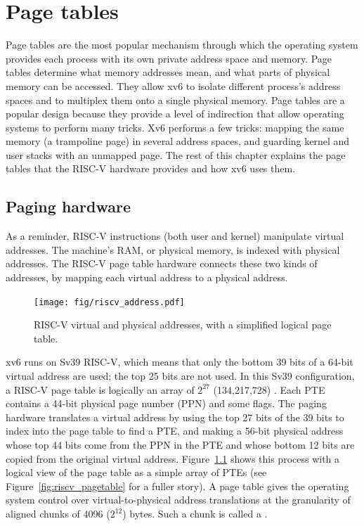 \chapter{Page tables}
\label{CH:MEM}

Page tables are the most popular mechanism through which the operating
system provides each process with its own private address space and
memory.  Page tables determine what memory addresses mean, and what
parts of physical memory can be accessed. They allow xv6 to isolate
different process's address spaces and to multiplex them onto a single
physical memory. Page tables are a popular design because they provide
a level of indirection that allow operating systems to perform many
tricks. Xv6 performs a few tricks: mapping the same memory
(a trampoline page) in several address spaces, and guarding kernel and
user stacks with an unmapped page. The rest of this chapter explains
the page tables that the RISC-V hardware provides and how xv6 uses
them.

\section{Paging hardware}
As a reminder,
RISC-V instructions (both user and kernel) manipulate virtual addresses.
The machine's RAM, or physical memory, is indexed with physical
addresses.
The RISC-V page table hardware connects these two kinds of addresses,
by mapping each virtual address to a physical address.

\begin{figure}[t]
\center
\texttt{[image: fig/riscv\_address.pdf]}
\caption{RISC-V virtual and physical addresses, with a simplified
logical page table.}
\label{fig:riscv_address}
\end{figure}

xv6 runs on Sv39 RISC-V, which means that only the bottom 39
bits of a 64-bit virtual address are used; the top 25 bits
are not used.
In this Sv39 configuration, a
RISC-V page table is logically an array of $2^{27}$ (134,217,728)
.  Each PTE contains a 44-bit
physical page number (PPN) and some flags. The paging hardware
translates a virtual address by using the top 27 bits of the 39 bits
to index into the page table to find a PTE, and making a 56-bit
physical address whose top 44 bits come from the PPN in the PTE
and whose bottom 12 bits are copied from the original virtual address.
Figure~\ref{fig:riscv_address} shows this
process with a logical view of the page table as a simple array of PTEs
(see Figure~\ref{fig:riscv_pagetable} for a fuller story).
A page table
gives the operating system control over virtual-to-physical address
translations at the granularity of aligned chunks of 4096 ($2^{12}$)
bytes.  Such a chunk is called a .

